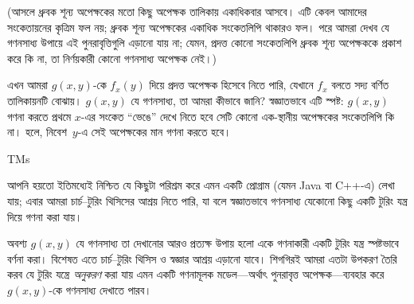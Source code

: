 \documentclass[../../../include/open-logic-section]{subfiles}
\begin{document}
(আসলে ধ্রুবক শূন্য অপেক্ষকের মতো কিছু অপেক্ষক তালিকায় একাধিকবার আসবে।
এটি কেবল আমাদের সংকেতায়নের কৃত্রিম ফল নয়; ধ্রুবক শূন্য অপেক্ষকের
একাধিক সংকেতলিপি থাকারও ফল। পরে আমরা দেখব যে গণনসাধ্য উপায়ে এই
পুনরাবৃত্তিগুলি এড়ানো যায় না; যেমন, প্রদত্ত কোনো সংকেতলিপি ধ্রুবক শূন্য
অপেক্ষককে প্রকাশ করে কি না, তা নির্ণয়কারী কোনো গণনসাধ্য অপেক্ষক নেই।)

এখন আমরা $g(x,y)$-কে $f_x(y)$ দিয়ে প্রদত্ত অপেক্ষক হিসেবে নিতে পারি,
যেখানে $f_x$ বলতে সদ্য বর্ণিত তালিকায়নটি বোঝায়। $g(x,y)$ যে গণনসাধ্য,
তা আমরা কীভাবে জানি? স্বজ্ঞাতভাবে এটি স্পষ্ট: $g(x,y)$ গণনা করতে প্রথমে
$x$-এর সংকেত “ভেঙে” দেখে নিতে হবে সেটি কোনো এক-স্থানীয় অপেক্ষকের
সংকেতলিপি কি না। হলে, নিবেশ~$y$-এ সেই অপেক্ষকের মান গণনা করতে হবে।

\begin{tagblock}{TMs}
\begin{digress}
আপনি হয়তো ইতিমধ্যেই নিশ্চিত যে কিছুটা পরিশ্রম করে এমন একটি প্রোগ্রাম
(যেমন Java বা C++-এ) লেখা যায়; এবার আমরা চার্চ--টুরিং থিসিসের আশ্রয়
নিতে পারি, যা বলে স্বজ্ঞাতভাবে গণনসাধ্য যেকোনো কিছু একটি টুরিং যন্ত্র দিয়ে
গণনা করা যায়।

অবশ্য $g(x,y)$ যে গণনসাধ্য তা দেখানোর আরও প্রত্যক্ষ উপায় হলো একে
গণনাকারী একটি টুরিং যন্ত্র স্পষ্টভাবে বর্ণনা করা। বিশেষত এতে
চার্চ--টুরিং থিসিস ও স্বজ্ঞার আশ্রয় এড়ানো যাবে। শিগগিরই আমরা এতটা
উপকরণ তৈরি করব যে টুরিং যন্ত্রে \emph{অনুকরণ} করা যায় এমন একটি
গণনামূলক মডেল—অর্থাৎ পুনরাবৃত্ত অপেক্ষক—ব্যবহার করে $g(x,y)$-কে গণনসাধ্য
দেখাতে পারব।
\end{digress}
\end{tagblock}
\end{document}
